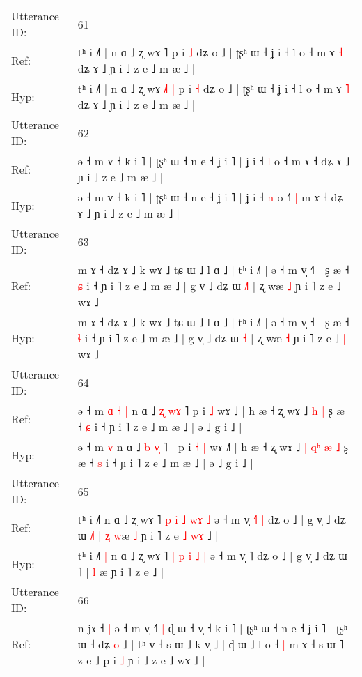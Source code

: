 \documentclass[10pt]{article}
\DeclareRobustCommand{\hl}[1]{{\textcolor{red}{#1}}}
\begin{document}
\begin{longtable}{ll}
 \\
\midrule
Utterance ID: & 61 \\
Ref: & tʰ i ˩˥ | n ɑ ˩ ʐ wɤ \hl{}˥\hl{}\hl{} p i \hl{˩} dʑ o ˩ | ʈʂʰ ɯ ˧ ʝ i ˧ l o ˧ m ɤ \hl{˧} dʑ ɤ ˩ ɲ i ˩ z e ˩ m æ ˩ |
 \\
Hyp: & tʰ i ˩˥ | n ɑ ˩ ʐ wɤ \hl{˩}˥\hl{ }\hl{|} p i \hl{˧} dʑ o ˩ | ʈʂʰ ɯ ˧ ʝ i ˧ l o ˧ m ɤ \hl{˥} dʑ ɤ ˩ ɲ i ˩ z e ˩ m æ ˩ |
 \\
\midrule
Utterance ID: & 62 \\
Ref: & ə ˧ m v̩ ˧ k i ˥ | ʈʂʰ ɯ ˧ n e ˧ ʝ i ˥ | ʝ i ˧ \hl{l} o ˧\hl{}\hl{}\hl{} m ɤ ˧ dʑ ɤ ˩ ɲ i ˩ z e ˩ m æ ˩ |
 \\
Hyp: & ə ˧ m v̩ ˧ k i ˥ | ʈʂʰ ɯ ˧ n e ˧ ʝ i ˥ | ʝ i ˧ \hl{n} o ˧\hl{˥}\hl{ }\hl{|} m ɤ ˧ dʑ ɤ ˩ ɲ i ˩ z e ˩ m æ ˩ |
 \\
\midrule
Utterance ID: & 63 \\
Ref: & m ɤ ˧ dʑ ɤ ˩ k wɤ ˩ tɕ ɯ ˩ l ɑ ˩ | tʰ i ˩˥ | ə ˧ m v̩ ˧\hl{˥} | ʂ æ ˧ \hl{ɕ} i ˧ ɲ i ˥ z e ˩ m æ ˩ | g v̩ ˩ dʑ ɯ \hl{˩}\hl{˥} | ʐ wæ \hl{˩} ɲ i ˥ z e ˩\hl{}\hl{} wɤ ˩ |
 \\
Hyp: & m ɤ ˧ dʑ ɤ ˩ k wɤ ˩ tɕ ɯ ˩ l ɑ ˩ | tʰ i ˩˥ | ə ˧ m v̩ ˧\hl{} | ʂ æ ˧ \hl{ɬ} i ˧ ɲ i ˥ z e ˩ m æ ˩ | g v̩ ˩ dʑ ɯ \hl{}\hl{˧} | ʐ wæ \hl{˧} ɲ i ˥ z e ˩\hl{ }\hl{|} wɤ ˩ |
 \\
\midrule
Utterance ID: & 64 \\
Ref: & ə ˧ m\hl{ }\hl{ɑ} \hl{˧}\hl{ }\hl{|} n ɑ ˩ \hl{ʐ} \hl{w}\hl{ɤ} ˥\hl{}\hl{} p i\hl{}\hl{} \hl{˩} wɤ ˩\hl{} | h æ ˧ ʐ wɤ ˩\hl{}\hl{}\hl{}\hl{}\hl{} \hl{h} \hl{|} ʂ æ ˧ \hl{ɕ} i ˧ ɲ i ˥ z e ˩ m æ ˩ | ə ˩ g i ˩ |
 \\
Hyp: & ə ˧ m\hl{}\hl{} \hl{}\hl{v}\hl{̩} n ɑ ˩ \hl{b} \hl{v}\hl{̩} ˥\hl{ }\hl{|} p i\hl{ }\hl{˧} \hl{|} wɤ ˩\hl{˥} | h æ ˧ ʐ wɤ ˩\hl{ }\hl{|}\hl{ }\hl{q}\hl{ʰ} \hl{æ} \hl{˩} ʂ æ ˧ \hl{s} i ˧ ɲ i ˥ z e ˩ m æ ˩ | ə ˩ g i ˩ |
 \\
\midrule
Utterance ID: & 65 \\
Ref: & tʰ i ˩˥\hl{}\hl{} n ɑ ˩ ʐ wɤ ˥ \hl{p} \hl{i} \hl{˩} \hl{w}\hl{ɤ} \hl{˩} ə ˧ m v̩ \hl{˧}˥\hl{ }\hl{|} dʑ o ˩ | g v̩ ˩ dʑ ɯ \hl{˩}˥ | \hl{ʐ} \hl{w}æ\hl{ }\hl{˩} ɲ i ˥ z e\hl{ }\hl{˩}\hl{ }\hl{w}\hl{ɤ} ˩ |
 \\
Hyp: & tʰ i ˩˥\hl{ }\hl{|} n ɑ ˩ ʐ wɤ ˥ \hl{|} \hl{p} \hl{i} \hl{}\hl{˩} \hl{|} ə ˧ m v̩ \hl{}˥\hl{}\hl{} dʑ o ˩ | g v̩ ˩ dʑ ɯ \hl{}˥ | \hl{l} \hl{}æ\hl{}\hl{} ɲ i ˥ z e\hl{}\hl{}\hl{}\hl{}\hl{} ˩ |
 \\
\midrule
Utterance ID: & 66 \\
Ref: & n jɤ ˧\hl{ }\hl{|} ə ˧ m v̩ ˧\hl{˥}\hl{ }\hl{|} ɖ ɯ ˧ v̩ ˧ k i ˥ | ʈʂʰ ɯ ˧ n e ˧ ʝ i ˥ | ʈʂʰ ɯ ˧ dʑ \hl{o} ˩ | tʰ v̩ ˧ s ɯ ˩ k v̩ ˩ | ɖ ɯ ˩ l o ˧\hl{ }\hl{|} m ɤ ˧ s ɯ ˥ z e ˩\hl{}\hl{} p i \hl{˩} ɲ i ˩ z e ˩ wɤ ˩ |

\end{longtable}
\end{document}
